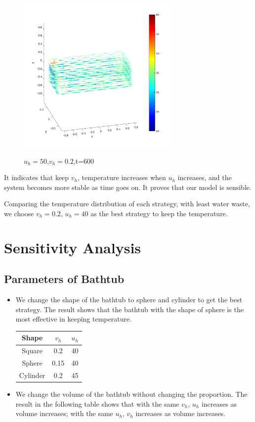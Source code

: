 \documentclass[12pt,a4paper,titlepage]{article}
\begin{document}
\begin{figure}[htb]
  \centering
  \includegraphics[width=8cm]{4-5.pdf}\\
  \caption{$u_h=50$,$v_h=0.2$,t=600}\label{4-5_p}
\end{figure}

It indicates that keep $v_h$, temperature increases when $u_h$ increases, and the system becomes more stable as time goes on. It proves that our model is sensible.

Comparing the temperature distribution of each strategy, with least water waste, we choose $v_h=0.2$, $u_h=40$ as the best strategy to keep the temperature.


\section{Sensitivity Analysis}
\label{sec:sensitivity-analysis}

\subsection{Parameters of Bathtub}
\label{sec:parameters of bathtub}
\begin{itemize}
\item We change the shape of the bathtub to sphere and cylinder to get the best strategy. The result shows that the bathtub with the shape of sphere is the most effective in keeping temperature.
\begin{center}
\begin{tabular}{c|c|c}
\hline
 Shape     &$v_h$  &$u_h$        \\ \hline
 Square    &0.2             & 40              \\ \hline
 Sphere    &0.15            & 40              \\ \hline
 Cylinder  &0.2             & 45              \\ \hline
\end{tabular}
\end{center}
     \item We change the volume of the bathtub without changing the proportion. The result in the following table shows that with the same $v_h$, $u_h$ increases as volume increases; with the same $u_h$, $v_h$ increases as volume increases.
\end{itemize}
\end{document}
